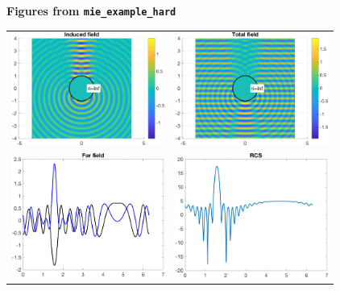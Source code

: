 \documentclass[11pt,letterpaper]{article}
\newcommand{\techheading}[1]{%
    \par\vspace{-0.3\parskip}\noindent\hspace{-1cm}\textbf{#1}%
    \par\vspace{-0.5\parskip}\noindent\nopagebreak\ignorespaces}
\begin{document}
\techheading{Figures from \texttt{mie\_example\_hard}}
\begin{center}
  \begin{tabular}{cc}
    \includegraphics[width=5cm]{mie_example_hard_figure1.png}
    &
    \includegraphics[width=5cm]{mie_example_hard_figure2.png}\\
    \includegraphics[width=5cm]{mie_example_hard_figure3.png}
    &
    \includegraphics[width=5cm]{mie_example_hard_figure4.png}
  \end{tabular}
\end{center}
\end{document}
